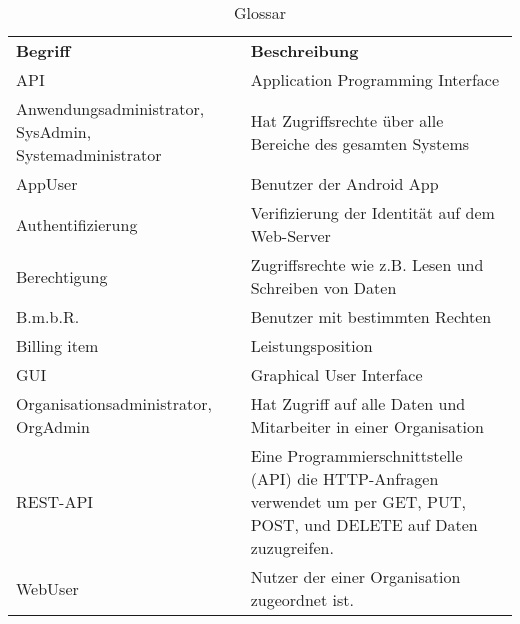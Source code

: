 
\begin{table}[h]
	\centering
	\begin{tabularx}{\textwidth}{X X}
		\rowcolor[HTML]{C0C0C0} 
		\textbf{Begriff} & \textbf{Beschreibung} \\
		
		API & Application Programming Interface\\

		\rowcolor[HTML]{E7E7E7} 
		Anwendungsadministrator, SysAdmin, Systemadministrator  & Hat Zugriffsrechte über alle Bereiche des gesamten Systems \\
		
		AppUser & Benutzer der Android App \\

		\rowcolor[HTML]{E7E7E7} 		
		Authentifizierung & Verifizierung der Identität auf dem Web-Server \\
		
		Berechtigung & Zugriffsrechte wie z.B. Lesen und Schreiben von Daten \\
		
		\rowcolor[HTML]{E7E7E7} 
		B.m.b.R. & Benutzer mit bestimmten Rechten \\
		
		Billing item & Leistungsposition \\
		
		\rowcolor[HTML]{E7E7E7} 
		GUI & Graphical User Interface \\
		
		Organisationsadministrator, OrgAdmin & Hat Zugriff auf alle Daten und Mitarbeiter in einer Organisation \\
		
		\rowcolor[HTML]{E7E7E7} 
		REST-API & Eine Programmierschnittstelle (API) die HTTP-Anfragen verwendet um per GET, PUT, POST, und DELETE auf Daten zuzugreifen.\\
		
		WebUser & Nutzer der einer Organisation zugeordnet ist. \\
		
	\end{tabularx}
	\caption{Glossar}
	\label{table:glossar}
\end{table}